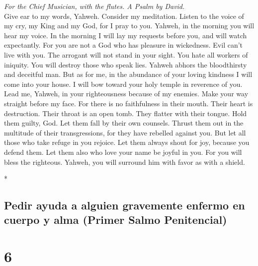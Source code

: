 \begin{paracol}{2}
\begin{otherlanguage}{english}
\emph{For the Chief Musician, with the flutes. A Psalm by David.}\\
 Give ear to my words, Yahweh. Consider my meditation.
 Listen to the voice of my cry, my King and my God, for I
pray to you.  Yahweh, in the morning you will hear my
voice. In the morning I will lay my requests before you, and will watch
expectantly.  For you are not a God who has pleasure in
wickedness. Evil can't live with you.  The arrogant will
not stand in your sight. You hate all workers of iniquity.
 You will destroy those who speak lies. Yahweh abhors the
bloodthirsty and deceitful man.  But as for me, in the
abundance of your loving kindness I will come into your house. I will
bow toward your holy temple in reverence of you.  Lead me,
Yahweh, in your righteousness because of my enemies. Make your way
straight before my face.  For there is no faithfulness in
their mouth. Their heart is destruction. Their throat is an open tomb.
They flatter with their tongue.  Hold them guilty, God.
Let them fall by their own counsels. Thrust them out in the multitude of
their transgressions, for they have rebelled against you.
 But let all those who take refuge in you rejoice. Let
them always shout for joy, because you defend them. Let them also who
love your name be joyful in you.  For you will bless the
righteous. Yahweh, you will surround him with favor as with a shield.

\end{otherlanguage}

\switchcolumn[0]*

\hypertarget{pedir-ayuda-a-alguien-gravemente-enfermo-en-cuerpo-y-alma-primer-salmo-penitencial}{%
\subsection{Pedir ayuda a alguien gravemente enfermo en cuerpo y alma
(Primer Salmo
Penitencial)}\label{pedir-ayuda-a-alguien-gravemente-enfermo-en-cuerpo-y-alma-primer-salmo-penitencial}}

\hypertarget{section-10}{%
\section{6}\label{section-10}}


\end{paracol}
